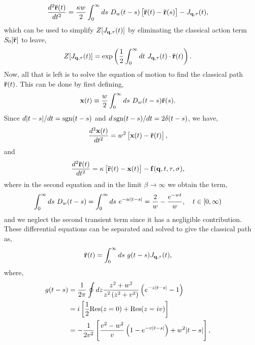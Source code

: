 \begin{equation}
    \frac{d^2 \vb{\bar{r}}(t)}{dt^2} = \frac{\kappa w}{2} \int^{\infty}_0 ds\ D_{w}(t-s) \left[\vb{\bar{r}}(t) - \vb{\bar{r}}(s)\right] - J_{\vb{q},\tau}(t) ,
\label{eqn-222-17}
\end{equation}
which can be used to simplify $Z[J_{\vb{q},\tau}(t)]$ by eliminating the classical action term $S_0[\vb{\bar{r}}]$ to leave,
\begin{equation}
    Z[J_{\vb{q},\tau}(t)] = \exp\left( \frac{1}{2} \int^{\infty}_0 dt\ J_{\vb{q},\tau}(t) \cdot \vb{\bar{r}}(t) \right).
\label{eqn-222-18}
\end{equation}
Now, all that is left is to solve the equation of motion to find the classical path $\vb{\bar{r}}(t)$. This can be done by first defining,
\begin{equation}
    \vb{x}(t) \equiv \frac{w}{2} \int^{\infty}_0 ds\ D_{w}(t-s) \vb{\bar{r}}(s).
\label{eqn-222-19}
\end{equation}
Since $d\abs{t-s}/dt = \operatorname{sgn}(t-s)$ and $d\operatorname{sgn}(t-s)/dt = 2\delta(t-s)$, we have,
\begin{equation}
    \frac{d^2\vb{x}(t)}{dt^2} = w^2 \left[\vb{x}(t) - \vb{\bar{r}}(t)\right],
\label{eqn-222-20}
\end{equation}
and
\begin{equation}
    \frac{d^2 \vb{\bar{r}}(t)}{dt^2} = \kappa \left[\vb{\bar{r}}(t) - \vb{x}(t)\right] - \vb{f}(\vb{q}, t, \tau, \sigma) ,
\label{eqn-222-21}
\end{equation}
where in the second equation and in the limit $\beta \to \infty$ we obtain the term,
\begin{equation}
    \int^\infty_0 ds\ D_w(t-s) = \int^\infty_0 ds\ e^{-w\abs{t-s}} = \frac{2}{w} - \frac{e^{-wt}}{w}, \quad t \in [0, \infty)
\label{eqn-222-22}
\end{equation}
and we neglect the second transient term since it has a negligible contribution. These differential equations can be separated and solved to give the classical path as,
\begin{equation}
    \vb{\bar{r}}(t) = \int^{\infty}_0 ds\ g(t-s) J_{\vb{q},\tau}(t),
\label{eqn-222-23}
\end{equation}
where,
\begin{equation}
\begin{aligned}
    g(t-s) &= \frac{1}{2\pi} \oint dz \frac{z^2 + w^2}{z^2 \left(z^2 + v^2\right)} \left(e^{-z\abs{t-s}}-1\right) \\
    &= i \left[\frac{1}{2} \mathrm{Res}(z=0) + \mathrm{Res}(z = iv) \right] \\
    &= -\frac{1}{2v^2} \left[ \frac{v^2-w^2}{v}\left(1 - e^{-v\abs{t-s}}\right) + w^2 \abs{t-s} \right],
\end{aligned}
\label{eqn-222-24}
\end{equation}
